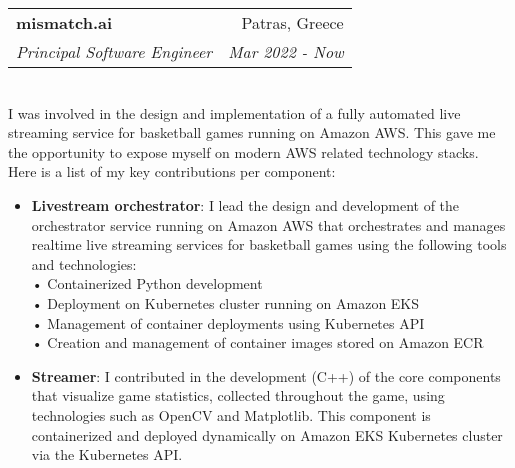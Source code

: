 \documentclass[letterpaper,10pt]{article}
\makeatletter
\newcommand{\resumeItem}[2]{
  \item\small{
    \textbf{#1}{: #2 \vspace{-2pt}}
  }
}
\newcommand{\resumeSubheading}[4]{
  \vspace{-1pt}\item
    \begin{tabular*}{0.97\textwidth}[t]{l@{\extracolsep{\fill}}r}
      \textbf{#1} & #2 \\
      \textit{\small#3} & \textit{\small #4} \\
    \end{tabular*}\vspace{-5pt}
}
\newcommand{\resumeItemListStart}{\begin{itemize}}
\newcommand{\resumeItemListEnd}{\end{itemize}\vspace{-5pt}}
\makeatother
\begin{document}
    \resumeSubheading
    {mismatch.ai}{Patras, Greece}
    {Principal Software Engineer}{Mar 2022 - Now}
    \newline \\I was involved in the design and implementation of a fully automated live streaming service for basketball games running on Amazon AWS. This gave me the opportunity to expose myself on modern AWS related technology stacks.\\
    Here is a list of my key contributions per component:
    \resumeItemListStart
      \resumeItem{Livestream orchestrator}
        {I lead the design and development of the orchestrator service running on Amazon AWS that orchestrates and manages realtime live streaming services for basketball games using the following tools and technologies:\\
        • Containerized Python development\\
        • Deployment on Kubernetes cluster running on Amazon EKS\\
        • Management of container deployments using Kubernetes API\\
        • Creation and management of container images stored on Amazon ECR\\
        }
      \resumeItem{Streamer}
        {I contributed in the development (C++) of the core components that visualize game statistics, collected throughout the game, using technologies such as OpenCV and Matplotlib. This component is containerized and deployed dynamically on Amazon EKS Kubernetes cluster via the Kubernetes API.
        }
    \resumeItemListEnd
\end{document}
